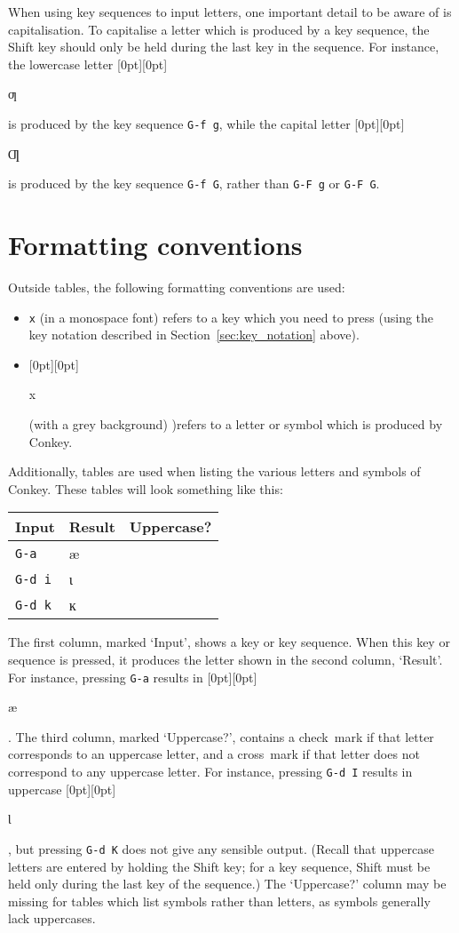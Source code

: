 \documentclass[oneside]{memoir}
\newcommand{\cmark}{\ding{51}}
\newcommand{\xmark}{\ding{55}}
\newcommand{\key}{\verb}
\newcommand{\out}[1]{\raisebox{0pt}[0pt][0pt]{\setlength{\fboxsep}{1pt}\colorbox{gray!20}{\strut{}#1}}}
\begin{document}
{{When using key sequences to input letters, one important detail to be aware of is capitalisation.
To capitalise a letter which is produced by a key sequence, the Shift key should only be held during the last key in the sequence.
For instance, the lowercase letter \out{ƣ} is produced by the key sequence \key|G-f g|,
  while the capital letter \out{Ƣ} is produced by the key sequence \key|G-f G|,
  rather than \key|G-F g| or \key|G-F G|.

\section{Formatting conventions}
\label{sec:formatting}

Outside tables, the following formatting conventions are used:

\begin{itemize}[noitemsep]
\item \key|x| (in a monospace font) refers to a key which you need to press (using the key notation described in Section~\ref{sec:key_notation} above).
\item \out{x} (with a grey background) )refers to a letter or symbol which is produced by Conkey.
\end{itemize}

Additionally, tables are used when listing the various letters and symbols of Conkey.
These tables will look something like this:

\medskip

\begin{tabular}{lll}
\toprule
Input & Result & Uppercase? \\
\midrule
\key|G-a|   & æ & \cmark \\
\key|G-d i| & ɩ & \cmark \\
\key|G-d k| & ĸ & \xmark \\
\bottomrule
\end{tabular}

\medskip

The first column, marked `Input', shows a key or key sequence.
When this key or sequence is pressed, it produces the letter shown in the second column, `Result'.
For instance, pressing \key|G-a| results in \out{æ}.
The third column, marked `Uppercase?', contains a check~mark if that letter corresponds to an uppercase letter,
  and a cross~mark if that letter does not correspond to any uppercase letter.
For instance, pressing \key|G-d I| results in uppercase \out{Ɩ},
  but pressing \key|G-d K| does not give any sensible output.
(Recall that uppercase letters are entered by holding the Shift key;
  for a key sequence, Shift must be held only during the last key of the sequence.)
The `Uppercase?' column may be missing for tables which list symbols rather than letters, as symbols generally lack uppercases.

}}
\end{document}
